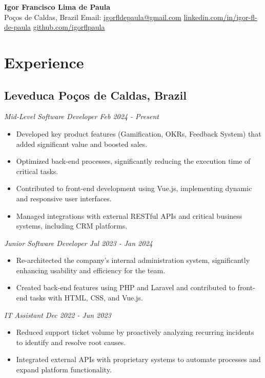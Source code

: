 \documentclass[a4paper,10pt]{article}
\begin{document}
\begin{center}
    {\LARGE \textbf{Igor Francisco Lima de Paula}} \\ [0.1cm]
    Poços de Caldas, Brazil {\textbullet}
    Email: \href{mailto:igorfldepaula@gmail.com}{igorfldepaula@gmail.com} {\textbullet}
    \href{https://www.linkedin.com/in/igor-fl-de-paula}{linkedin.com/in/igor-fl-de-paula} {\textbullet}
    \href{https://github.com/igorflpaula}{github.com/igorflpaula}
\end{center}

\section{Experience}
    \subsection*{\texorpdfstring{
        \textbf{Leveduca} \hfill Poços de Caldas, Brazil
        }{
            Leveduca -- Poços de Caldas, Brazil
        }}
    \textit{Mid-Level Software Developer \hfill Feb 2024 - Present}
        \begin{itemize} 
            \item Developed key product features (Gamification, OKRs, Feedback System) that added significant value and boosted sales.
            \item Optimized back-end processes, significantly reducing the execution time of critical tasks.
            \item Contributed to front-end development using Vue.js, implementing dynamic and responsive user interfaces.
            \item Managed integrations with external RESTful APIs and critical business systems, including CRM platforms.
        \end{itemize}
    \textit{Junior Software Developer \hfill Jul 2023 - Jan 2024}
        \begin{itemize} 
            \item Re-architected the company's internal administration system, significantly enhancing usability and efficiency for the team.
            \item Created back-end features using PHP and Laravel and contributed to front-end tasks with HTML, CSS, and Vue.js.
        \end{itemize}
    \textit{IT Assistant \hfill Dec 2022 - Jun 2023}
        \begin{itemize} 
            \item Reduced support ticket volume by proactively analyzing recurring incidents to identify and resolve root causes.
            \item Integrated external APIs with proprietary systems to automate processes and expand platform functionality.
        \end{itemize}
        
\end{document}
